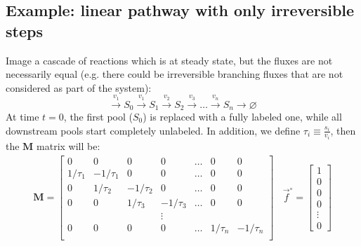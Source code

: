 \documentclass{article}
\newcommand{\finit}{\ensuremath{\vec{f}^\circ}}
\begin{document}
\subsection{Example: linear pathway with only irreversible steps}
Image a cascade of reactions which is at steady state, but the fluxes are not necessarily equal (e.g. there could be irreversible branching fluxes that are not considered as part of the system):
\begin{equation}
    \xrightarrow{v_1} S_0 
    \xrightarrow{v_1} S_1 
    \xrightarrow{v_2} S_2
    \xrightarrow{v_3} \ldots 
    \xrightarrow{v_n} S_n
    \rightarrow \varnothing
\end{equation}
At time $t = 0$, the first pool ($S_0$) is replaced with a fully labeled one, while all downstream pools start completely unlabeled. In addition, we define $\tau_i \equiv \frac{s_i}{v_i}$, then the $\mathbf{M}$ matrix will be:
\begin{eqnarray}
\mathbf{M} =
  \begin{bmatrix}
    0 & 0 & 0 & 0 & \ldots & 0 & 0\\
    1/\tau_1 & -1/\tau_1 & 0 & 0 & \ldots & 0 & 0\\
    0 & 1/\tau_2 & -1/\tau_2 & 0 & \ldots & 0 & 0\\
    0 & 0 & 1/\tau_3 & -1/\tau_3 & \ldots & 0 & 0\\
    & & & \vdots & & &\\
    0 & 0 & 0 & 0 & \ldots & 1/\tau_n & -1/\tau_n \\
  \end{bmatrix}
  ~~~~
  \finit = 
  \begin{bmatrix}
  1 \\ 0 \\ 0 \\ 0 \\ \vdots \\ 0
  \end{bmatrix}
\end{eqnarray}
\end{document}

